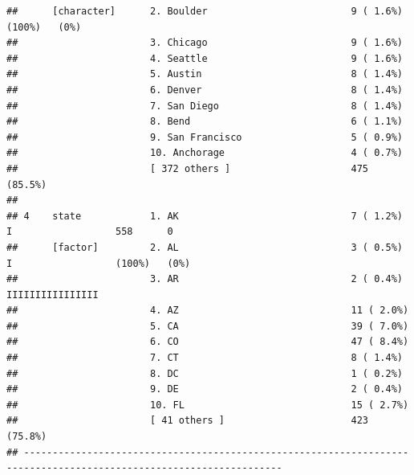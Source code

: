 \documentclass[]{article}
\begin{document}
\begin{verbatim}
##      [character]      2. Boulder                         9 ( 1.6%)                               (100%)   (0%)     
##                       3. Chicago                         9 ( 1.6%)                                                 
##                       4. Seattle                         9 ( 1.6%)                                                 
##                       5. Austin                          8 ( 1.4%)                                                 
##                       6. Denver                          8 ( 1.4%)                                                 
##                       7. San Diego                       8 ( 1.4%)                                                 
##                       8. Bend                            6 ( 1.1%)                                                 
##                       9. San Francisco                   5 ( 0.9%)                                                 
##                       10. Anchorage                      4 ( 0.7%)                                                 
##                       [ 372 others ]                     475 (85.5%)                                               
## 
## 4    state            1. AK                              7 ( 1.2%)            I                  558      0        
##      [factor]         2. AL                              3 ( 0.5%)            I                  (100%)   (0%)     
##                       3. AR                              2 ( 0.4%)            IIIIIIIIIIIIIIII                     
##                       4. AZ                              11 ( 2.0%)                                                
##                       5. CA                              39 ( 7.0%)                                                
##                       6. CO                              47 ( 8.4%)                                                
##                       7. CT                              8 ( 1.4%)                                                 
##                       8. DC                              1 ( 0.2%)                                                 
##                       9. DE                              2 ( 0.4%)                                                 
##                       10. FL                             15 ( 2.7%)                                                
##                       [ 41 others ]                      423 (75.8%)                                               
## -------------------------------------------------------------------------------------------------------------------
\end{verbatim}
\end{document}
